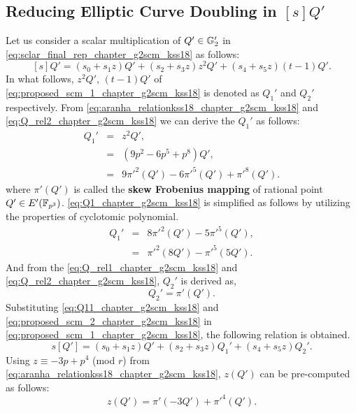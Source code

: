 \subsection{Reducing Elliptic Curve Doubling in \texorpdfstring{$[s]Q'$}{[s]Q}}
Let us consider a scalar multiplication of $Q' \in {\mathbb{G}}_{2}'$ in \eqref{eq:sclar_final_rep_chapter_g2scm_kss18} as follows:
\begin{equation}\label{eq:proposed_scm_1_chapter_g2scm_kss18}
[s]Q' =  (s_0+s_1z)Q' + (s_2 +s_3z)z^2Q'  +(s_4+s_5z)(t-1)Q'.
\end{equation}
In what follows, $z^2Q'$, $(t-1)Q'$ of \eqref{eq:proposed_scm_1_chapter_g2scm_kss18} is denoted as $Q_1'$ and $Q_2'$ respectively. From \eqref{eq:aranha_relationkss18_chapter_g2scm_kss18} and \eqref{eq:Q_rel2_chapter_g2scm_kss18} we can derive the $Q_1'$ as follows:
\begin{eqnarray}\label{eq:Q1_chapter_g2scm_kss18}
Q_1'& = & z^2 Q', \nonumber \\
& = & (9p^2-6p^5+p^8)Q',\nonumber \\
& = & 9\pi'^2(Q')-6\pi'^5(Q')+\pi'^8(Q').
\end{eqnarray}
where $\pi' (Q')$ is called the \textbf{skew Frobenius mapping} of rational point $Q' \in E'(\mathbb{F}_{p^3})$.
\eqref{eq:Q1_chapter_g2scm_kss18} is simplified as follows by utilizing the properties of cyclotomic polynomial.
\begin{eqnarray}\label{eq:Q11_chapter_g2scm_kss18}
Q_1' & = & 8\pi'^2(Q')-5\pi'^5(Q'),  \nonumber\\
& = & \pi'^2(8Q')-\pi'^5(5Q'). 
\end{eqnarray}
And from the \eqref{eq:Q_rel1_chapter_g2scm_kss18} and \eqref{eq:Q_rel2_chapter_g2scm_kss18}, $Q_2'$ is derived as,
\begin{equation}\label{eq:proposed_scm_2_chapter_g2scm_kss18}
Q_2' = \pi' (Q').
\end{equation}
Substituting \eqref{eq:Q11_chapter_g2scm_kss18} and \eqref{eq:proposed_scm_2_chapter_g2scm_kss18} in \eqref{eq:proposed_scm_1_chapter_g2scm_kss18}, the following relation is obtained. 
\begin{equation}\label{eq:proposed_scm_0_chapter_g2scm_kss18}
s[Q'] =  (s_0+s_1z)Q' + (s_2 +s_3z)Q_1' +(s_4+s_5z)Q_2'.
\end{equation}
Using $z \equiv -3p + p^4$ (mod $r$) from \eqref{eq:aranha_relationkss18_chapter_g2scm_kss18}, $z(Q')$ can be pre-computed as follows:
\begin{equation}
z(Q') = \pi'(-3Q') +\pi'^4(Q').
\end{equation}

